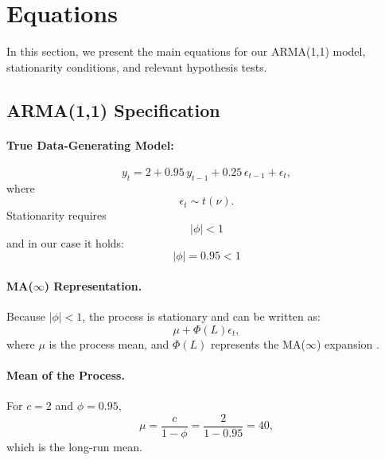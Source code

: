 \documentclass[a4paper,12pt]{article}
\begin{document}
\clearpage
\section{Equations}

In this section, we present the main equations for our ARMA(1,1) model, stationarity conditions, and relevant hypothesis tests.

\subsection{ARMA(1,1) Specification}

\paragraph{True Data-Generating Model:}
\begin{equation}
    y_t = 2 + 0.95 \, y_{t-1} + 0.25 \, \epsilon_{t-1} + \epsilon_t,
    \label{eq:arma}
\end{equation}
where 
\begin{equation}
    \epsilon_t \sim t(\nu).
\end{equation}
Stationarity requires
\begin{equation}
    |\phi| < 1
\end{equation}
and in our case it holds:
\begin{equation}
    |\phi| = 0.95 < 1
    \label{eq:stat}
\end{equation}

\paragraph{MA(\(\infty\)) Representation.} 
Because \(\lvert \phi\rvert<1\), the process is stationary and can be written as:
\begin{equation}
    \mu + \Phi(L)\epsilon_t,
    \label{eq:Mainf}
\end{equation}
where \(\mu\) is the process mean, and \(\Phi(L)\) represents the MA(\(\infty\)) expansion \citep[see][Section 3.4]{Hamilton1994}.  

\paragraph{Mean of the Process.}
For \(c=2\) and \(\phi=0.95\),
\begin{equation}
     \mu=\frac{c}{1-\phi} = \frac{2}{1 - 0.95} = 40,
    \label{eq:Mean}
\end{equation}
which is the long-run mean.
\end{document}
